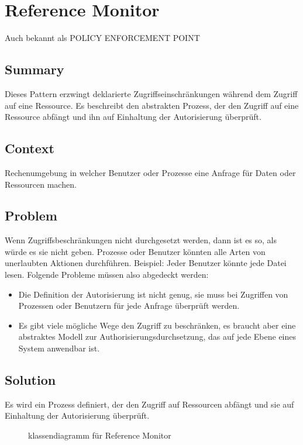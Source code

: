 \chapter{Reference Monitor}

Auch bekannt als POLICY ENFORCEMENT POINT

\section{Summary}
Dieses Pattern erzwingt deklarierte Zugriffseinschränkungen während dem Zugriff auf eine Ressource. Es beschreibt den abstrakten Prozess, der den Zugriff auf eine Ressource abfängt und ihn auf Einhaltung der Autorisierung überprüft.

\section{Context}
Rechenumgebung in welcher Benutzer oder Prozesse eine Anfrage für Daten oder Ressourcen machen.

\section{Problem}
Wenn Zugriffsbeschränkungen nicht durchgesetzt werden, dann ist es so, als würde es sie nicht geben. Prozesse oder Benutzer könnten alle Arten von unerlaubten Aktionen durchführen. Beispiel: Jeder Benutzer könnte jede Datei lesen.  Folgende Probleme müssen also abgedeckt werden:
\begin{itemize}
  \item Die Definition der Autorisierung ist nicht genug, sie muss bei Zugriffen von Prozessen oder Benutzern für jede Anfrage überprüft werden.
  \item Es gibt viele mögliche Wege den Zugriff zu beschränken, es braucht aber eine abstraktes Modell zur Authorisierungsdurchsetzung, das auf jede Ebene eines System anwendbar ist.
\end{itemize}

\section{Solution}
Es wird ein Prozess definiert, der den Zugriff auf Ressourcen abfängt und sie auf Einhaltung der Autorisierung überprüft.

\begin{figure}[!ht]
  \centering
  
  \caption{klassendiagramm f\"ur Reference Monitor}
\end{figure}

